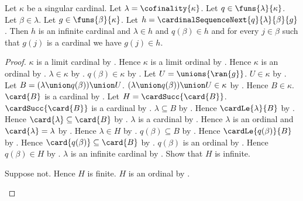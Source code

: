 \begin{proposition}\label{cardinal_sequence_next_properties}
    Let $\kappa$ be a singular cardinal.
    Let $\lambda=\cofinality{\kappa}$.
    Let $q\in\funs{\lambda}{\kappa}$.
    Let $\beta\in\lambda$.
    Let $g\in\funs{\beta}{\kappa}$.
    Let $h=\cardinalSequenceNext{q}{\lambda}{\beta}{g}$.
    Then $h$ is an infinite cardinal and $\lambda\in h$ and
        $q(\beta)\in h$ and
        for every $j\in\beta$ such that $g(j)$ is a cardinal
            we have $g(j)\in h$.
\end{proposition}
\begin{proof}
    $\kappa$ is a limit cardinal
        by .
    Hence $\kappa$ is a limit ordinal
        by .
    Hence $\kappa$ is an ordinal by .
    $\lambda\in\kappa$
        by .
    $q(\beta)\in\kappa$ by .
    Let $U=\unions{\ran{g}}$.
    $U\in\kappa$ by .
    Let $B=(\lambda\union q(\beta))\union U$.
    $(\lambda\union q(\beta))\union U\in\kappa$
        by .
    Hence $B\in\kappa$.
    $\card{B}$ is a cardinal by .
    Let $H=\cardSucc{\card{B}}$.
    $\cardSucc{\card{B}}$ is a cardinal
        by .
    $\lambda\subseteq B$
        by .
    Hence $\cardLe{\lambda}{B}$ by .
    Hence $\card{\lambda}\subseteq\card{B}$
        by .
    $\lambda$ is a cardinal by .
    Hence $\lambda$ is an ordinal and $\card{\lambda}=\lambda$
        by .
    Hence $\lambda\in H$
        by .
    $q(\beta)\subseteq B$
        by .
    Hence $\cardLe{q(\beta)}{B}$ by .
    Hence $\card{q(\beta)}\subseteq\card{B}$
        by .
    $q(\beta)$ is an ordinal by .
    Hence $q(\beta)\in H$
        by .
    $\lambda$ is an infinite cardinal
        by .
    Show that $H$ is infinite.
    \begin{subproof}
        Suppose not.
        Hence $H$ is finite.
        $H$ is an ordinal by .

\end{subproof}
\end{proof}
